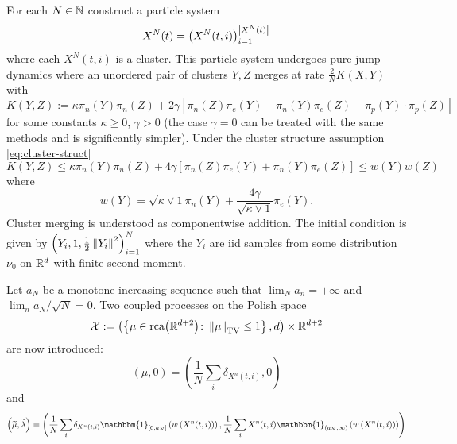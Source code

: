 For each $N\in\mathbb{N}$ construct a particle system
\begin{equation}\label{eq:particle-sys}
    X^N(t) = \left(X^N(t,i)\right)_{i=1}^{\left\lvert{X^N(t)}\right\rvert}
\end{equation}
where each $X^N(t,i)$ is a cluster.
This particle system undergoes pure jump dynamics where an unordered pair of clusters $Y,Z$ merges at rate $\frac2N K(X,Y)$ with
\begin{equation} \label{eq: kernel}
  K(Y,Z):=
    \kappa \pi_n\left(Y\right)\pi_n\left(Z\right)
    + 2\gamma \left[\pi_n\left(Z\right)\pi_e\left(Y\right)
                  +\pi_n\left(Y\right)\pi_e\left(Z\right)
                  -\pi_p\left(Y\right)\cdot\pi_p\left(Z\right)\right]
\end{equation}
for some constants $\kappa \geq 0$, $\gamma > 0$ (the case $\gamma = 0$ can be treated with the same methods and is significantly simpler).
Under the cluster structure assumption \eqref{eq:cluster-struct}
\begin{equation}\label{eq:kernel-bound}
    K(Y,Z) \leq \kappa \pi_n\left(Y\right)\pi_n\left(Z\right)
               + 4 \gamma \left[\pi_n\left(Z\right)\pi_e\left(Y\right)
                  +\pi_n\left(Y\right)\pi_e\left(Z\right)\right]
            \leq w(Y) w(Z)
\end{equation}
where
\begin{equation}\label{eq:wdef}
  w(Y) = \sqrt{\kappa \vee 1}\pi_n(Y) + \frac{4\gamma}{\sqrt{\kappa \vee 1}} \pi_e(Y).    
\end{equation}
Cluster merging is understood as componentwise addition.
The initial condition is given by $\left(Y_i, 1, \frac12 \left\lVert{Y_i}\right\rVert^2\right)_{i=1}^N$ where the $Y_i$ are iid samples from some distribution $\nu_0$ on $\mathbb{R}^d$ with finite second moment. 

Let $a_N$ be a monotone increasing sequence such that $\lim_N a_n = +\infty$ and $\lim_n a_N / \sqrt{N} = 0$.
Two coupled processes on the Polish space
\begin{equation}\label{eq:state-space}
 \mathcal{X} := \left(\left\{\mu \in \mathrm{rca}{\left({\mathbb{R}^{d+2}}\right)} \colon \left\lVert{\mu}\right\rVert_\mathrm{TV} \leq 1 \right\}, d\right)
 \times
 \mathbb{R}^{d+2}
\end{equation}
are now introduced:
\begin{equation}\label{eq:mu}
    (\mu ,0) = \left(\frac{1}{N} \sum_i \delta_{X^n(t,i)}, 0\right)
\end{equation}
and
\begin{equation}\label{eq:mut}
    \left(\widetilde{\mu} ,\widetilde{\lambda}\right) =
    \left(\frac{1}{N} \sum_i \delta_{X^n(t,i)} \mathbbm{1}_{[0, a_N]}\left(w\left(X^n(t,i)\right)\right),
          \frac{1}{N} \sum_i         X^n(t,i) \mathbbm{1}_{(a_N, \infty)}\left(w\left(X^n(t,i)\right)\right)\right)
\end{equation}

